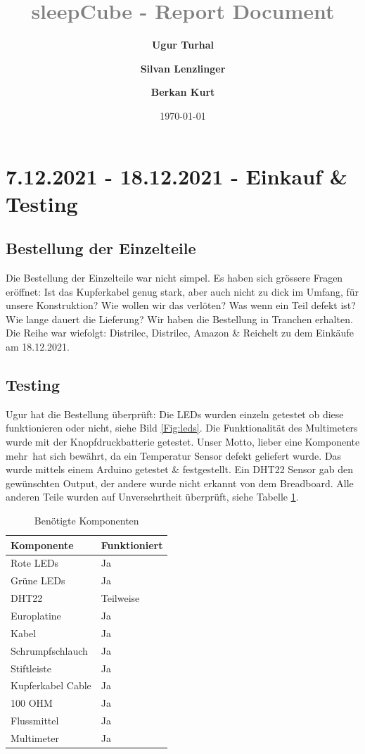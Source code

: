 \documentclass[12pt]{article}
\title{\textcolor{gray}{\textbf{sleepCube - Report Document}\\[0.2cm]}}
\author[1]{\fontsize{9}{9} \textbf{Ugur Turhal}}
\author[2]{\textbf{Silvan Lenzlinger}}
\author[1]{\textbf{Berkan Kurt}}
\affil[1]{\fontsize{8}{8}\href{mailto:ugur.turhal@me.com}{ugur.turhal@me.com}}
\affil[2]{test}
\affil[3]{test}
\date{\today}
\begin{document}
\maketitle

\section{7.12.2021 - 18.12.2021 - Einkauf \& Testing}
\justifying
\subsection{Bestellung der Einzelteile} 
Die Bestellung der Einzelteile war nicht simpel. Es haben sich grössere Fragen eröffnet: Ist das Kupferkabel genug stark, aber auch nicht zu dick im Umfang, für unsere Konstruktion? Wie wollen wir das verlöten? Was wenn ein Teil defekt ist? Wie lange dauert die Lieferung? Wir haben die Bestellung in Tranchen erhalten. Die Reihe war wiefolgt: Distrilec, Distrilec, Amazon \& Reichelt zu dem Einkäufe am 18.12.2021. \par \subsection{Testing} Ugur hat die Bestellung überprüft: Die LEDs wurden einzeln getestet ob diese funktionieren oder nicht, siehe Bild \ref{Fig:leds}. Die Funktionalität des Multimeters wurde mit der Knopfdruckbatterie getestet. Unser Motto, \glqq lieber eine Komponente mehr\grqq\ hat sich bewährt, da ein Temperatur Sensor defekt geliefert wurde. Das wurde mittels einem Arduino getestet \& festgestellt. Ein DHT22 Sensor gab den gewünschten Output, der andere wurde nicht erkannt von dem Breadboard. Alle anderen Teile wurden auf Unversehrtheit überprüft, siehe Tabelle \ref{Tab:table1}.
\begin{table}[H]
\begin{center}
\begin{tabular}{l|l}
Komponente & Funktioniert \\ \hline
\hline
Rote LEDs   & Ja \\ \hline
Grüne LEDs   & Ja \\ \hline
DHT22   & Teilweise \\ \hline
Europlatine   & Ja \\ \hline
Kabel  & Ja  \\ \hline
Schrumpfschlauch & Ja \\ \hline
Stiftleiste   & Ja \\ \hline
Kupferkabel Cable  & Ja \\ \hline
100 OHM  & Ja \\ \hline
Flussmittel & Ja \\ \hline
Multimeter & Ja \\ \hline
\end{tabular}
\caption{Benötigte Komponenten}
\label{Tab:table1}
\end{center}
\end{table}
\end{document}
